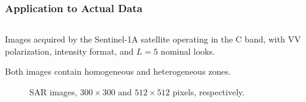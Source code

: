 \documentclass[aspectratio=169,10pt]{beamer}
\begin{document}
\begin{frame} \frametitle{\large{Application to Actual Data }}\vspace{-0.6cm}
 \justifying
\begin{columns}[T,onlytextwidth]
    \begin{column}{.99\textwidth}
			\begin{block}{}\justifying
			Images acquired by the Sentinel-1A satellite operating in the C band, with VV polarization, intensity format, and
\(L=5\) nominal looks.

Both images contain homogeneous and heterogeneous zones.
				\begin{figure}[H]
    \centering
    \vspace{-0.4cm}
    \caption*{SAR images, $300\times300$ and $512\times512$ pixels, respectively. }
    \label{fig:real_SAR_Images_coe}
\end{figure}

		\end{block}
    \end{column}

\end{columns}\vspace{0.2cm}
       

\end{frame} 
\end{document}
